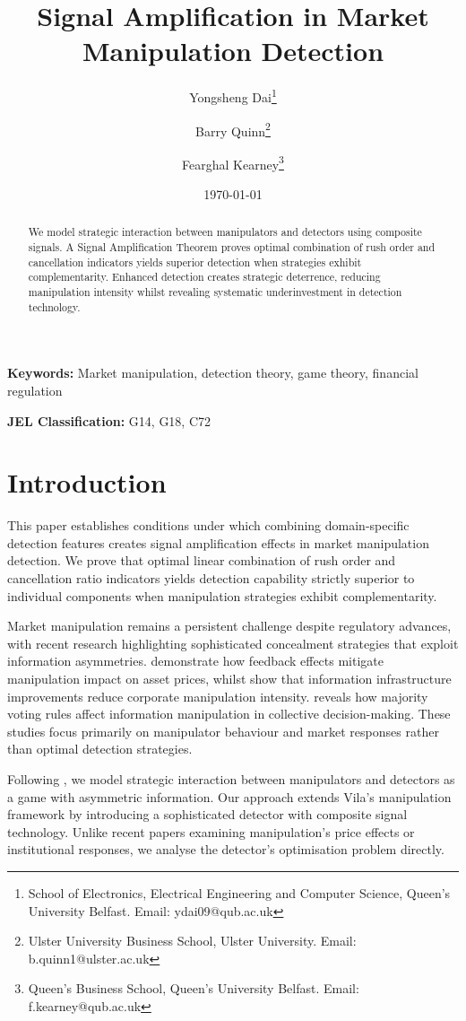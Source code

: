 \documentclass[12pt]{article}
\title{Signal Amplification in Market Manipulation Detection}
\author{Yongsheng Dai\thanks{School of Electronics, Electrical Engineering and Computer Science, Queen's University Belfast. Email: ydai09@qub.ac.uk} \and 
Barry Quinn\thanks{Ulster University Business School, Ulster University. Email: b.quinn1@ulster.ac.uk} \and 
Fearghal Kearney\thanks{Queen's Business School, Queen's University Belfast. Email: f.kearney@qub.ac.uk}}
\date{\today}
\begin{document}
\maketitle

\begin{abstract}
    We model strategic interaction between manipulators and detectors using composite signals. A Signal Amplification Theorem proves optimal combination of rush order and cancellation indicators yields superior detection when strategies exhibit complementarity. Enhanced detection creates strategic deterrence, reducing manipulation intensity whilst revealing systematic underinvestment in detection technology.
\end{abstract}

\textbf{Keywords:} Market manipulation, detection theory, game theory, financial regulation

\textbf{JEL Classification:} G14, G18, C72

\section{Introduction}

This paper establishes conditions under which combining domain-specific detection features creates signal amplification effects in market manipulation detection. We prove that optimal linear combination of rush order and cancellation ratio indicators yields detection capability strictly superior to individual components when manipulation strategies exhibit complementarity.

Market manipulation remains a persistent challenge despite regulatory advances, with recent research highlighting sophisticated concealment strategies that exploit information asymmetries. \citet{liu2024asset} demonstrate how feedback effects mitigate manipulation impact on asset prices, whilst \citet{xiong2024information} show that information infrastructure improvements reduce corporate manipulation intensity. \citet{wang2024information} reveals how majority voting rules affect information manipulation in collective decision-making. These studies focus primarily on manipulator behaviour and market responses rather than optimal detection strategies.

Following \citet{vila1989simple}, we model strategic interaction between manipulators and detectors as a game with asymmetric information. Our approach extends Vila's manipulation framework by introducing a sophisticated detector with composite signal technology. Unlike recent papers examining manipulation's price effects or institutional responses, we analyse the detector's optimisation problem directly.
\end{document}
